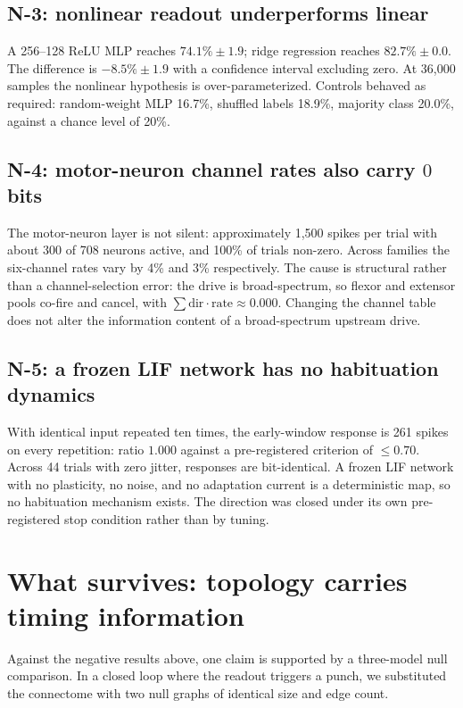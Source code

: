 \documentclass[11pt]{article}
\begin{document}
\subsection{N-3: nonlinear readout underperforms linear}

A 256--128 ReLU MLP reaches $74.1\% \pm 1.9$; ridge regression reaches
$82.7\% \pm 0.0$. The difference is $-8.5\% \pm 1.9$ with a confidence interval
excluding zero. At 36{,}000 samples the nonlinear hypothesis is
over-parameterized. Controls behaved as required: random-weight MLP 16.7\%,
shuffled labels 18.9\%, majority class 20.0\%, against a chance level of 20\%.

\subsection{N-4: motor-neuron channel rates also carry $0$ bits}

The motor-neuron layer is not silent: approximately 1{,}500 spikes per trial with
about 300 of 708 neurons active, and 100\% of trials non-zero. Across families the
six-channel rates vary by 4\% and 3\% respectively. The cause is structural rather
than a channel-selection error: the drive is broad-spectrum, so flexor and
extensor pools co-fire and cancel, with $\sum \mathrm{dir}\cdot\mathrm{rate}
\approx 0.000$. Changing the channel table does not alter the information content
of a broad-spectrum upstream drive.

\subsection{N-5: a frozen LIF network has no habituation dynamics}

With identical input repeated ten times, the early-window response is 261 spikes
on every repetition: ratio $1.000$ against a pre-registered criterion of
$\leq 0.70$. Across 44 trials with zero jitter, responses are bit-identical.
A frozen LIF network with no plasticity, no noise, and no adaptation current is a
deterministic map, so no habituation mechanism exists. The direction was closed
under its own pre-registered stop condition rather than by tuning.

\section{What survives: topology carries timing information}
\label{sec:positive}

Against the negative results above, one claim is supported by a three-model null
comparison. In a closed loop where the readout triggers a punch, we substituted
the connectome with two null graphs of identical size and edge count.
\end{document}
